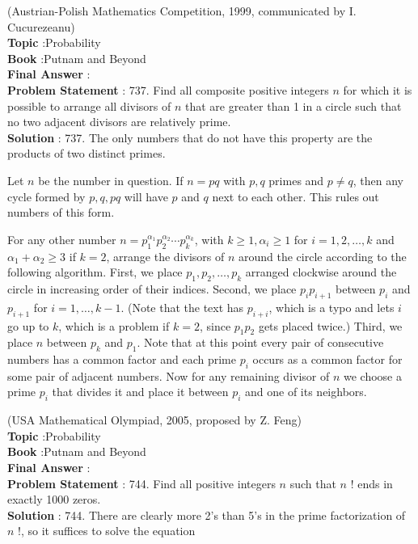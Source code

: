 \documentclass[10pt]{article}
\begin{document}
(Austrian-Polish Mathematics Competition, 1999, communicated by I. Cucurezeanu)
\\
\textbf{Topic} :Probability\\
\textbf{Book} :Putnam and Beyond\\
\textbf{Final Answer} :\\


\textbf{Problem Statement} :
737. Find all composite positive integers $n$ for which it is possible to arrange all divisors of $n$ that are greater than 1 in a circle such that no two adjacent divisors are relatively prime.
\\
\textbf{Solution} :
737. The only numbers that do not have this property are the products of two distinct primes.

Let $n$ be the number in question. If $n=p q$ with $p, q$ primes and $p \neq q$, then any cycle formed by $p, q, p q$ will have $p$ and $q$ next to each other. This rules out numbers of this form.

For any other number $n=p_{1}^{\alpha_{1}} p_{2}^{\alpha_{2}} \cdots p_{k}^{\alpha_{k}}$, with $k \geq 1, \alpha_{i} \geq 1$ for $i=1,2, \ldots, k$ and $\alpha_{1}+\alpha_{2} \geq 3$ if $k=2$, arrange the divisors of $n$ around the circle according to the following algorithm. First, we place $p_{1}, p_{2}, \ldots, p_{k}$ arranged clockwise around the circle in increasing order of their indices. Second, we place $p_{i} p_{i+1}$ between $p_{i}$ and $p_{i+1}$ for $i=1, \ldots, k-1$. (Note that the text has $p_{i+i}$, which is a typo and lets $i$ go up to $k$, which is a problem if $k=2$, since $p_{1} p_{2}$ gets placed twice.) Third, we place $n$ between $p_{k}$ and $p_{1}$. Note that at this point every pair of consecutive numbers has a common factor and each prime $p_{i}$ occurs as a common factor for some pair of adjacent numbers. Now for any remaining divisor of $n$ we choose a prime $p_{i}$ that divides it and place it between $p_{i}$ and one of its neighbors.

(USA Mathematical Olympiad, 2005, proposed by Z. Feng) 
\\
\textbf{Topic} :Probability\\
\textbf{Book} :Putnam and Beyond\\
\textbf{Final Answer} :\\


\textbf{Problem Statement} :
744. Find all positive integers $n$ such that $n$ ! ends in exactly 1000 zeros.
\\
\textbf{Solution} :
744. There are clearly more 2's than 5's in the prime factorization of $n$ !, so it suffices to solve the equation
\end{document}
